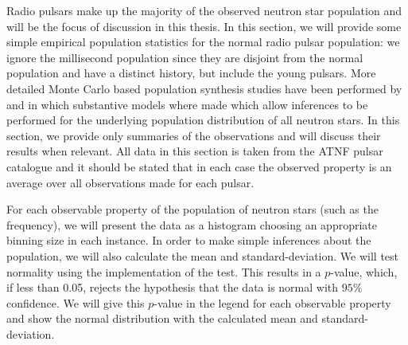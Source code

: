 Radio pulsars make up the majority of the observed neutron star population and
will be the focus of discussion in this thesis. In this section, we will
provide some simple empirical population statistics for the normal radio pulsar
population: we ignore the millisecond population since they are disjoint from
the normal population and have a distinct history, but include the young
pulsars. More detailed Monte Carlo based population synthesis studies have been
performed by \citet{faucher2006birth} and \citet{popov2010population} in which
substantive models where made which allow inferences to be performed for the
underlying population distribution of all neutron stars. In this section, we
provide only summaries of the observations and will discuss their results when
relevant.  All data in this section is taken from the ATNF pulsar catalogue
\citet{ATNF} and it should be stated that in each case the observed property is
an average over all observations made for each pulsar.

For each observable property of the population of neutron stars (such as the
frequency), we will present the data as a histogram choosing an appropriate
binning size in each instance. In order to make simple inferences about the
population, we will also calculate the mean and standard-deviation.
We will test normality using the \citet{Scipy} implementation of the
\citet{d1971omnibus} test. This results in a $p$-value, which, if less than
0.05, rejects the hypothesis that the data is normal with $95\%$ confidence. We
will give this $p$-value in the legend for each observable property and show
the normal distribution with the calculated mean and standard-deviation.


